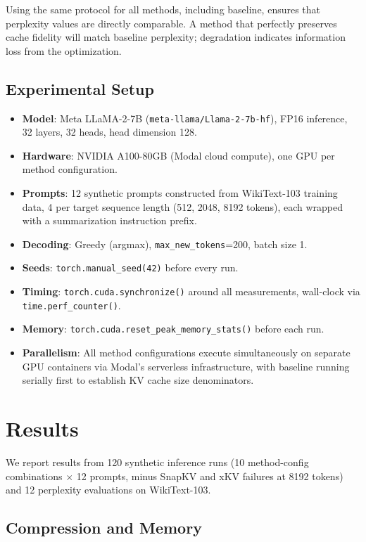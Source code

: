 \documentclass[conference]{IEEEtran}
\begin{document}
Using the same protocol for all methods, including baseline, ensures that perplexity values are directly comparable. A method that perfectly preserves cache fidelity will match baseline perplexity; degradation indicates information loss from the optimization.

\subsection{Experimental Setup}

\begin{itemize}
    \item \textbf{Model}: Meta LLaMA-2-7B (\texttt{meta-llama/Llama-2-7b-hf}), FP16 inference, 32 layers, 32 heads, head dimension 128.
    \item \textbf{Hardware}: NVIDIA A100-80GB (Modal cloud compute), one GPU per method configuration.
    \item \textbf{Prompts}: 12 synthetic prompts constructed from WikiText-103 training data, 4 per target sequence length (512, 2048, 8192 tokens), each wrapped with a summarization instruction prefix.
    \item \textbf{Decoding}: Greedy (argmax), \texttt{max\_new\_tokens}=200, batch size 1.
    \item \textbf{Seeds}: \texttt{torch.manual\_seed(42)} before every run.
    \item \textbf{Timing}: \texttt{torch.cuda.synchronize()} around all measurements, wall-clock via \texttt{time.perf\_counter()}.
    \item \textbf{Memory}: \texttt{torch.cuda.reset\_peak\_memory\_stats()} before each run.
    \item \textbf{Parallelism}: All method configurations execute simultaneously on separate GPU containers via Modal's serverless infrastructure, with baseline running serially first to establish KV cache size denominators.
\end{itemize}

\section{Results}

We report results from 120 synthetic inference runs (10 method-config combinations $\times$ 12 prompts, minus SnapKV and xKV failures at 8192 tokens) and 12 perplexity evaluations on WikiText-103.

\subsection{Compression and Memory}
\end{document}
